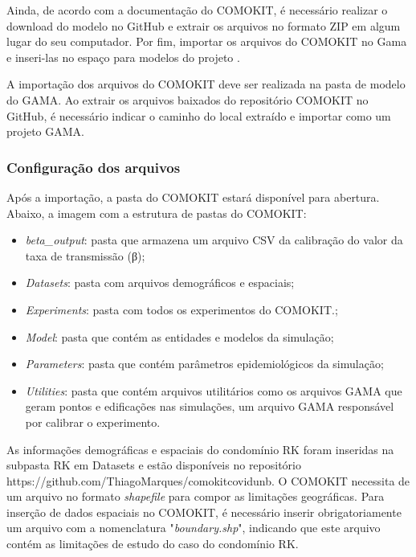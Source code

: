 Ainda, de acordo com a documentação do COMOKIT, é necessário realizar o download do modelo no GitHub e extrair os arquivos no formato ZIP em algum lugar do seu computador. Por fim, importar os arquivos do COMOKIT no Gama e inseri-las no espaço para modelos do projeto \cite{ComokitDoc}.



A importação dos arquivos do COMOKIT deve ser realizada na pasta de modelo do GAMA. Ao extrair os arquivos baixados do repositório COMOKIT no GitHub, é necessário indicar o caminho do local extraído e importar como um projeto GAMA.

\subsubsection{Configuração dos arquivos}

Após a importação, a pasta do COMOKIT estará disponível para abertura. Abaixo, a imagem com a estrutura de pastas do COMOKIT:

\begin{itemize}
\item \textit{beta\_output}: pasta que armazena um arquivo CSV da calibração do valor da taxa de transmissão (β);
\item \textit{Datasets}: pasta com arquivos demográficos e espaciais;
\item \textit{Experiments}: pasta com todos os experimentos do COMOKIT.;
\item \textit{Model}: pasta que contém as entidades e modelos da simulação;
\item \textit{Parameters}: pasta que contém parâmetros epidemiológicos da simulação;
\item \textit{Utilities}: pasta que contém arquivos utilitários como os arquivos GAMA que geram pontos e edificações nas simulações, um arquivo GAMA responsável por calibrar o experimento.
\end{itemize}

As informações demográficas e espaciais do condomínio RK foram inseridas na subpasta RK em Datasets e estão disponíveis no repositório https://github.com/ThiagoMarques/comokitcovidunb. O COMOKIT necessita de um arquivo no formato \textit{shapefile} para compor as limitações geográficas. Para inserção de dados espaciais no COMOKIT, é necessário inserir obrigatoriamente um arquivo com a nomenclatura "\textit{boundary.shp}", indicando que este arquivo contém as limitações de estudo do caso do condomínio RK.

